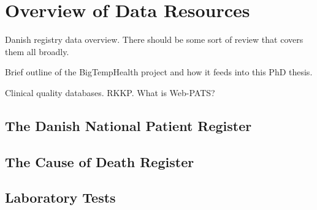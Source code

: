 \chapter{Overview of Data Resources}

Danish registry data overview. 
There should be some sort of review that covers them all broadly.

Brief outline of the BigTempHealth project
and how it feeds into this PhD thesis.

Clinical quality databases. RKKP.
What is Web-PATS? 

\section{The Danish National Patient Register}

\section{The Cause of Death Register}

\section{Laboratory Tests}
